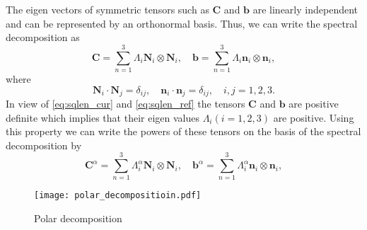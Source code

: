 The eigen vectors of symmetric tensors such as \(\mathbf{C}\) and \(\mathbf{b}\) are linearly independent and can be represented by an orthonormal basis. Thus, we can write the spectral decomposition as
\begin{equation}
    \mathbf{C} = \sum_{n = 1}^{3}\Lambda_{i}\bm{N}_{i} \otimes \bm{N}_{i}, \quad
    \mathbf{b} = \sum_{n = 1}^{3}\Lambda_{i}\bm{n}_{i} \otimes \bm{n}_{i},
    \label{eq:spectraldecomposition}
\end{equation}
where
\begin{equation}
    \bm{N}_{i} \cdot \bm{N}_{j} = \delta_{ij}, \quad
    \bm{n}_{i} \cdot \bm{n}_{j} = \delta_{ij}, \quad
    i,j = 1,2,3.
\end{equation}
In view of \cref{eq:sqlen_cur} and \cref{eq:sqlen_ref} the tensors \(\mathbf{C}\) and \(\mathbf{b}\) are positive definite which implies that their eigen values \(\Lambda_{i}(i=1,2,3)\) are positive. Using this property we can write the powers of these tensors on the basis of the spectral decomposition by
\begin{equation}
    \mathbf{C}^{\alpha} = \sum_{n = 1}^{3}\Lambda_{i}^{\alpha}\bm{N}_{i} \otimes \bm{N}_{i}, \quad
    \mathbf{b}^{\alpha} = \sum_{n = 1}^{3}\Lambda_{i}^{\alpha}\bm{n}_{i} \otimes \bm{n}_{i},
    \label{eq:power_C}
\end{equation}
\begin{figure}[htpb]
    \centering
    \texttt{[image: polar\_decompositioin.pdf]}
    \caption{Polar decomposition}%
    \label{fig:polar_decompositioin}
\end{figure}

